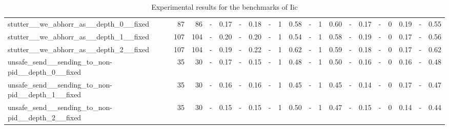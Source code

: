 \documentclass{article}
\newcommand{\iic}{{\sc Iic}}
\begin{document}
\begin{table}[h]
\begin{center}
\begin{tabular}{ | l | r | r | *{17}{ r | } }
stutter\_\_we\_abhorr\_as\_\_depth\_0\_\_fixed & 87 & 86 & - & 0.17 & - & 0.18 & - & 1 & 0.58 & - & 1 & 0.60 & - & 0.17 & - & 0 & 0.19 & - & 0.55 \\
stutter\_\_we\_abhorr\_as\_\_depth\_1\_\_fixed & 107 & 104 & - & 0.20 & - & 0.20 & - & 1 & 0.54 & - & 1 & 0.58 & - & 0.19 & - & 0 & 0.17 & - & 0.56 \\
stutter\_\_we\_abhorr\_as\_\_depth\_2\_\_fixed & 107 & 104 & - & 0.19 & - & 0.22 & - & 1 & 0.62 & - & 1 & 0.59 & - & 0.18 & - & 0 & 0.17 & - & 0.62 \\
unsafe\_send\_\_sending\_to\_non-pid\_\_depth\_0\_\_fixed & 35 & 30 & - & 0.17 & - & 0.15 & - & 1 & 0.48 & - & 1 & 0.50 & - & 0.16 & - & 0 & 0.16 & - & 0.48 \\
unsafe\_send\_\_sending\_to\_non-pid\_\_depth\_1\_\_fixed & 35 & 30 & - & 0.16 & - & 0.16 & - & 1 & 0.45 & - & 1 & 0.45 & - & 0.14 & - & 0 & 0.17 & - & 0.47 \\
unsafe\_send\_\_sending\_to\_non-pid\_\_depth\_2\_\_fixed & 35 & 30 & - & 0.15 & - & 0.15 & - & 1 & 0.50 & - & 1 & 0.47 & - & 0.15 & - & 0 & 0.14 & - & 0.44 \\
    \hline
  \end{tabular}
\end{center}
\caption{Experimental results for the benchmarks of \iic}
\label{iic-experiments}
\end{table}
\end{document}
